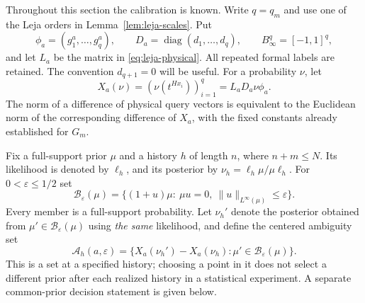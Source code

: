 Throughout this section the calibration is known. Write $q=q_m$ and use
one of the Leja orders in Lemma~\ref{lem:leja-scales}. Put
\[
 \phi_a=(g_1^a,\ldots,g_q^a),\qquad
 D_a=\operatorname{diag}(d_1,\ldots,d_q),\qquad
 B_\infty^q=[-1,1]^q,
\]
and let $L_a$ be the matrix in \eqref{eq:leja-physical}. All repeated
formal labels are retained. The convention $d_{q+1}=0$ will be useful.
For a probability $\nu$, let
\[
 X_a(\nu)=(\nu(t^{Hx_i}))_{i=1}^q=L_aD_a\nu\phi_a.
\]
The norm of a difference of physical query vectors is equivalent to the
Euclidean norm of the corresponding difference of $X_a$, with the fixed
constants already established for $G_m$.

Fix a full-support prior $\mu$ and a history $h$ of length $n$, where
$n+m\le N$. Its likelihood is denoted by $\ell_h$, and its posterior
by $\nu_h=\ell_h\mu/\mu\ell_h$. For $0<\varepsilon\le1/2$ set
\begin{equation}\label{eq:relative-prior-ball}
 \mathcal B_\varepsilon(\mu)=
 \{(1+u)\mu:\ \mu u=0,\ \|u\|_{L^\infty(\mu)}\le\varepsilon\}.
\end{equation}
Every member is a full-support probability. Let $\nu_h'$ denote the
posterior obtained from $\mu'\in\mathcal B_\varepsilon(\mu)$ using
\emph{the same} likelihood, and define the centered ambiguity set
\begin{equation}\label{eq:ambiguity-body}
 \mathcal A_h(a,\varepsilon)=
 \{X_a(\nu_h')-X_a(\nu_h):\mu'\in\mathcal B_\varepsilon(\mu)\}.
\end{equation}
This is a set at a specified history; choosing a point in it does not
select a different prior after each realized history in a statistical
experiment. A separate common-prior decision statement is given below.

